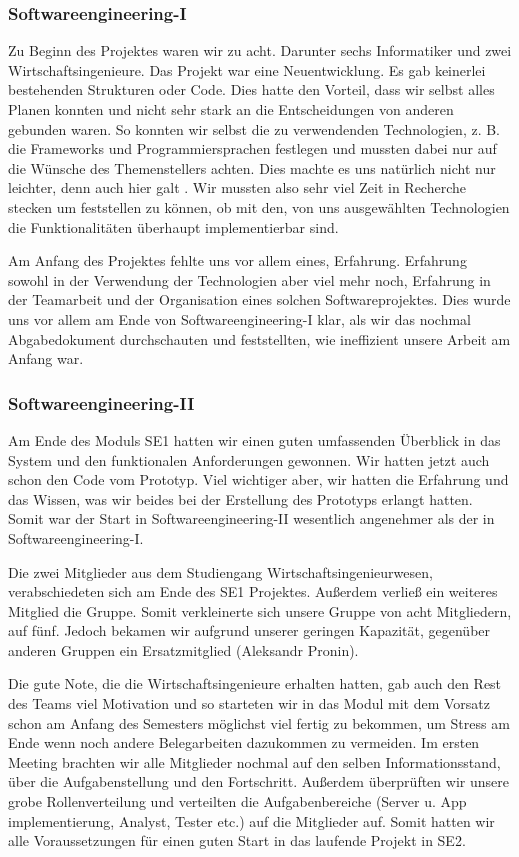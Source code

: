 \documentclass[10pt]{article}
\begin{document}
\subsubsection{Softwareengineering-I}
Zu Beginn des Projektes waren wir zu acht. Darunter sechs Informatiker und zwei Wirtschaftsingenieure.
Das Projekt war eine Neuentwicklung. Es gab keinerlei bestehenden Strukturen oder Code. Dies hatte den Vorteil, dass wir
selbst alles Planen konnten und nicht sehr stark an die Entscheidungen von anderen gebunden waren. So konnten wir
selbst die zu verwendenden Technologien, z. B. die Frameworks und Programmiersprachen festlegen und mussten dabei
nur auf die Wünsche des Themenstellers achten. Dies machte es uns natürlich nicht nur leichter, denn auch
hier galt . Wir mussten also sehr viel Zeit in Recherche stecken um
feststellen zu können, ob mit den, von uns ausgewählten Technologien die Funktionalitäten überhaupt implementierbar sind.\par
\medskip
Am Anfang des Projektes fehlte uns vor allem eines, Erfahrung. Erfahrung sowohl in der Verwendung der Technologien
aber viel mehr noch, Erfahrung in der Teamarbeit und der Organisation eines solchen Softwareprojektes.
Dies wurde uns vor allem am Ende von Softwareengineering-I klar, als wir das nochmal Abgabedokument durchschauten
und feststellten, wie ineffizient unsere Arbeit am Anfang war.

\subsubsection{Softwareengineering-II}
Am Ende des Moduls SE1 hatten wir einen guten umfassenden
Überblick in das System und den funktionalen Anforderungen gewonnen. 
Wir hatten jetzt auch schon den Code vom Prototyp. Viel wichtiger aber, wir hatten die Erfahrung und das Wissen, was
wir beides bei der Erstellung des Prototyps erlangt hatten. Somit war der Start in Softwareengineering-II wesentlich
angenehmer als der in Softwareengineering-I.\par
\medskip
Die zwei Mitglieder aus dem Studiengang Wirtschaftsingenieurwesen, verabschiedeten 
sich am Ende des SE1 Projektes.
Außerdem verließ ein weiteres Mitglied die Gruppe. Somit verkleinerte sich unsere Gruppe von acht Mitgliedern,
auf fünf. Jedoch bekamen wir aufgrund unserer geringen Kapazität, 
gegenüber anderen Gruppen ein Ersatzmitglied (Aleksandr Pronin). \par 
\medskip
 Die gute Note, die die Wirtschaftsingenieure erhalten hatten, gab auch den
Rest des Teams viel Motivation und so starteten wir in das Modul mit dem Vorsatz schon am Anfang des Semesters möglichst
viel fertig zu bekommen, um Stress am Ende wenn noch andere Belegarbeiten dazukommen zu vermeiden.
Im ersten Meeting brachten wir alle Mitglieder nochmal auf den selben Informationsstand, 
über die Aufgabenstellung und den Fortschritt. 
Außerdem überprüften wir unsere grobe Rollenverteilung und verteilten die Aufgabenbereiche 
(Server u. App implementierung, Analyst, Tester etc.)
auf die Mitglieder auf. Somit hatten wir alle Voraussetzungen für einen guten Start in das laufende Projekt in SE2.
\end{document}
